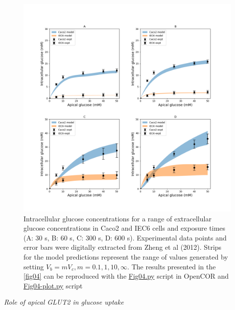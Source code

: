 \documentclass[fleqn,10pt]{physiome}
\begin{document}
\begin{figure}[ht]
\centering
\includegraphics[width=0.9\linewidth]{fig04.png}
\caption{Intracellular glucose concentrations for a range of extracellular glucose concentrations in Caco2 and IEC6 cells and exposure times (A: 30 s, B: 60 s, C: 300 s, D: 600 s). Experimental data points and error bars were digitally extracted from Zheng et al (2012). Strips for the model predictions represent the range of values generated by setting $V_b = m V_c, m = 0.1, 1, 10, \infty$. The results presented in the \autoref{fig04} can be reproduced with the \href{https://models.physiomeproject.org/workspace/572/file/c052b0c460280139dad150937fbee4fa6a026505/SEDML_files/Fig04.py}{Fig04.py} script in OpenCOR and \href{https://models.physiomeproject.org/workspace/572/file/c052b0c460280139dad150937fbee4fa6a026505/SEDML_files/Fig04_plot.py}{Fig04-plot.py} script}
\label{fig04}
\end{figure}\newline

\textit{Role of apical GLUT2 in glucose uptake}\newline
\end{document}
